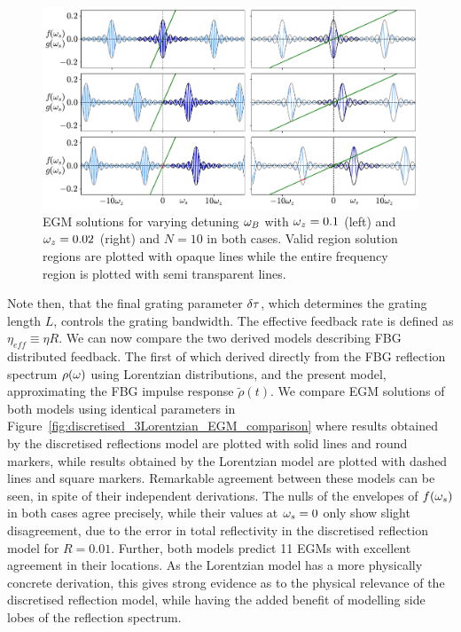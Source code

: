 %
\begin{figure}[!t]
    \flushleft
    \hspace{0.5em}
    \includegraphics[width=0.9\linewidth]{Images/discretised_EGM_minimumN.pdf}
    
    \caption{EGM solutions for varying detuning $\omega_B$ with $\omega_z=0.1$ (left) and $\omega_z=0.02$ (right) and $N=10$ in both cases. 
    Valid region solution regions are plotted with opaque lines while the entire frequency region is plotted with semi transparent lines.}
    
    \label{fig:discretised_EGM_minimumN}
\end{figure}
%
\par
%
Note then, that the final grating parameter $\delta \tau$, which determines the grating length $L$, controls the grating bandwidth. 
The effective feedback rate is defined as $\eta_{eff} \equiv \eta R$. We can now compare the two derived models describing FBG distributed feedback. 
The first of which derived directly from the FBG reflection spectrum $\rho(\omega)$ using Lorentzian distributions, and the present model, approximating the FBG impulse response $\tilde{\rho}(t)$. 
We compare EGM solutions of both models using identical parameters in Figure~\ref{fig:discretised_3Lorentzian_EGM_comparison} where results obtained by the discretised reflections model are plotted with solid lines and round markers, 
while results obtained by the Lorentzian model are plotted with dashed lines and square markers. 
Remarkable agreement between these models can be seen, in spite of their independent derivations. 
The nulls of the envelopes of $f(\omega_s)$ in both cases agree precisely, while their values at $\omega_s=0$ only show slight disagreement, due to the error in total reflectivity in the discretised reflection model for $R=0.01$. 
Further, both models predict 11 EGMs with excellent agreement in their locations. 
As the Lorentzian model has a more physically concrete derivation, this gives strong evidence as to the physical relevance of the discretised reflection model, while having the added benefit of modelling side lobes of the reflection spectrum. 